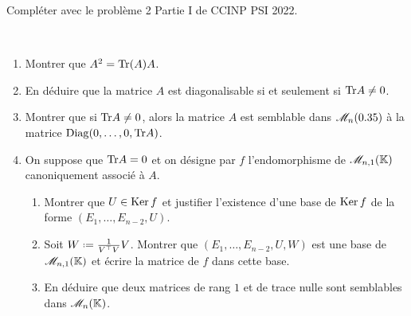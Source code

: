Compléter avec le problème 2 Partie I de CCINP PSI 2022.

\begin{exercice}
     \\
    \begin{enumerate}
        \item Montrer que $A^2 = \mathrm{Tr} (A) A$.
        \item En déduire que la matrice $A$ est diagonalisable si et seulement si $\mathrm{Tr} A \not= 0$.
        \item Montrer que si $\mathrm{Tr} A \not= 0$, alors la matrice $A$ est semblable dans $\mathscr{M}_n(0.35)$ à la matrice $\mathrm{Diag}(0, \dots, 0, \mathrm{Tr} A)$.
        \item On suppose que $\mathrm{Tr} A = 0$ et on désigne par $f$ l'endomorphisme de $\mathscr{M}_{n,1}(\mathbb{K})$ canoniquement associé à $A$. 
        \begin{enumerate}
            \item Montrer que $U \in \mathrm{Ker}\, f$ et justifier l'existence d'une base de $\mathrm{Ker}\, f$ de la forme $(E_1, \dots, E_{n-2}, U)$. 
            \item Soit $W \defeq \frac{1}{\Trsp{V}V}V$. Montrer que $(E_1, \dots, E_{n-2}, U, W)$ est une base de $\mathscr{M}_{n,1}(\mathbb{K})$ et écrire la matrice de $f$ dans cette base. 
            \item En déduire que deux matrices de rang $1$ et de trace nulle sont semblables dans $\mathscr{M}_n(\mathbb{K})$.
        \end{enumerate}
    \end{enumerate}
\end{exercice}

\begin{solution}
    
\end{solution}